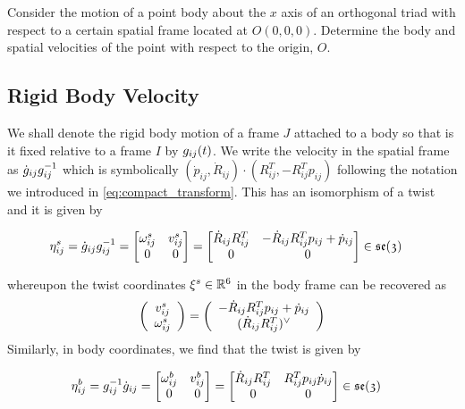 \noindent 
\begin{homework}
	Consider the motion of a point body about the $x$ axis of an orthogonal triad with respect to a certain spatial frame located at $O(0,0,0)$. Determine the body and spatial velocities of the point with respect to the origin, $O$.
\end{homework}

\subsection{Rigid Body Velocity}
%
We shall denote the rigid body motion of a frame $J$ attached to a body so that is it fixed relative to a frame $I$ by ${g}_{ij}(t)$. We write the velocity in the spatial frame as $	\dot{g}_{ij} g_{ij}^{-1} $ which is symbolically $\left(\dot{p}_{ij}, \dot{R}_{ij}\right) \cdot \left({R}_{ij}^T, -{R}_{ij}^Tp_{ij}\right)$ following the notation we introduced in \eqref{eq:compact_transform}. This has an isomorphism of a twist and it is given by 
%
\begin{tcolorbox}[title=Twist in Spatial Frame]
	\begin{align}
	\eta_{ij}^s = \dot{g}_{ij} g_{ij}^{-1} 
	&= \begin{bmatrix}
	{\omega}_{ij}^s & {v}_{ij}^s \\
	0 & 0
	\end{bmatrix} = 
	\begin{bmatrix}
	\dot{{R}}_{ij} {R}_{ij}^T  & -\dot{{R}}_{ij} {R}_{ij}^T  p_{ij} + \dot{p}_{ij}\\
	0 & 0
	\end{bmatrix} \in \mathfrak{se(3)} 
	\label{eq:twist_spatial}
	\end{align}
\end{tcolorbox}
%
whereupon the twist coordinates $\xi^s \in \mathbb{R}^6$ in the body frame can be recovered as 
%
\begin{align}
	\left(
	\begin{array}{c}
	{v}_{ij}^s  \\ {\omega}_{ij}^s 
	\end{array}
	\right) = \left(
	\begin{array}{c}
	-\dot{{R}}_{ij} {R}_{ij}^T  p_{ij} + \dot{p}_{ij} \\ 	(\dot{{R}}_{ij} {R}_{ij}^T)^{\vee}
	\end{array}
	\right) 
\end{align}
%
Similarly, in body coordinates, we find that the twist is given by 
%
\begin{tcolorbox}[title=Twist in Body Frame]
	\begin{align}
	\eta_{ij}^b = g_{ij}^{-1} \dot{g}_{ij} 
	&= \begin{bmatrix}
	{\omega}_{ij}^b & {v}_{ij}^b \\
	0 & 0
	\end{bmatrix} = 
	\begin{bmatrix}
	\dot{{R}}_{ij} {R}_{ij}^T  & {R}_{ij}^T  p_{ij} \dot{p}_{ij}\\
	0 & 0
	\end{bmatrix} \in \mathfrak{se(3)} 
	\label{eq:twist_body}
	\end{align}
\end{tcolorbox}

